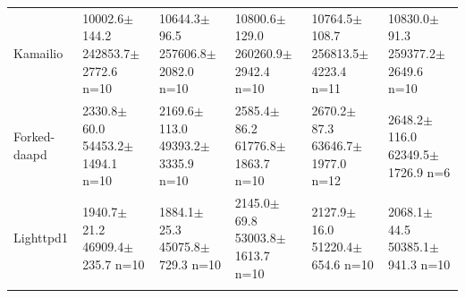 \documentclass[final,5p,times,number]{elsarticle}
\begin{document}
\begin{table}[!tp]
\begin{tabularx}{\textwidth}{l *{5}{>{\centering\arraybackslash}X}}
\addlinespace[3pt]
Kamailio & \shortstack{10002.6$\pm$144.2\\242853.7$\pm$2772.6\\n=10} & \shortstack{10644.3$\pm$96.5\\257606.8$\pm$2082.0\\n=10} & \shortstack{10800.6$\pm$129.0\\260260.9$\pm$2942.4\\n=10} & \shortstack{10764.5$\pm$108.7\\256813.5$\pm$4223.4\\n=11} & \shortstack{10830.0$\pm$91.3\\259377.2$\pm$2649.6\\n=10} \\
\addlinespace[3pt]
Forked-daapd & \shortstack{2330.8$\pm$60.0\\54453.2$\pm$1494.1\\n=10} & \shortstack{2169.6$\pm$113.0\\49393.2$\pm$3335.9\\n=10} & \shortstack{2585.4$\pm$86.2\\61776.8$\pm$1863.7\\n=10} & \shortstack{2670.2$\pm$87.3\\63646.7$\pm$1977.0\\n=12} & \shortstack{2648.2$\pm$116.0\\62349.5$\pm$1726.9\\n=6} \\
\addlinespace[3pt]
Lighttpd1 & \shortstack{1940.7$\pm$21.2\\46909.4$\pm$235.7\\n=10} & \shortstack{1884.1$\pm$25.3\\45075.8$\pm$729.3\\n=10} & \shortstack{2145.0$\pm$69.8\\53003.8$\pm$1613.7\\n=10} & \shortstack{2127.9$\pm$16.0\\51220.4$\pm$654.6\\n=10} & \shortstack{2068.1$\pm$44.5\\50385.1$\pm$941.3\\n=10} \\
\addlinespace[3pt]
\bottomrule
\end{tabularx}
\end{table}
\end{document}
